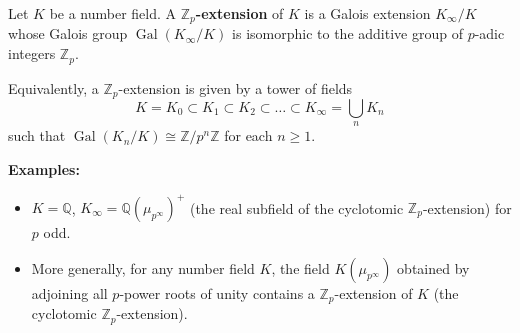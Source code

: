 Let $K$ be a number field. A \textbf{$\mathbb{Z}_p$-extension} of $K$ is a Galois extension $K_{\infty}/K$ whose Galois group $\operatorname{Gal}(K_{\infty}/K)$ is isomorphic to the additive group of $p$-adic integers $\mathbb{Z}_p$.

Equivalently, a $\mathbb{Z}_p$-extension is given by a tower of fields
$$K = K_0 \subset K_1 \subset K_2 \subset \dots \subset K_{\infty} = \bigcup_n K_n$$
such that $\operatorname{Gal}(K_n/K) \cong \mathbb{Z}/p^n\mathbb{Z}$ for each $n \ge 1$.

\textbf{Examples:}
\begin{itemize}
\item $K = \mathbb{Q}$, $K_{\infty} = \mathbb{Q}(\mu_{p^{\infty}})^+$ (the real subfield of the cyclotomic $\mathbb{Z}_p$-extension) for $p$ odd.
\item More generally, for any number field $K$, the field $K(\mu_{p^{\infty}})$ obtained by adjoining all $p$-power roots of unity contains a $\mathbb{Z}_p$-extension of $K$ (the cyclotomic $\mathbb{Z}_p$-extension).
\end{itemize}
